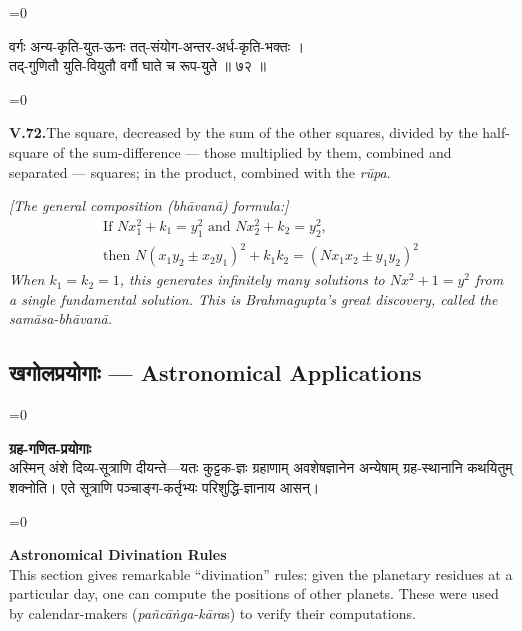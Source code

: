 \documentclass[11pt,a4paper]{article}
\newcommand{\dev}[1]{{\devanagarifont\color{sktcolor}#1}}
\newcommand{\iast}[1]{\textit{#1}}
\newenvironment{paracol}[1]{\begingroup}{\endgroup}
\newcommand{\switchcolumn}[1][]{%
  \ifnum#1=0\relax\else\par\nobreak\vspace{0.5em}\par\nobreak\fi%
}
\begin{document}
\begin{paracol}{2}
\switchcolumn[0]
\dev{%
वर्गः अन्य-कृति-युत-ऊनः तत्-संयोग-अन्तर-अर्ध-कृति-भक्तः ।\\
तद्-गुणितौ युति-वियुतौ वर्गौ घाते च रूप-युते ॥ ७२ ॥
}

\switchcolumn[1]
\textbf{V.72.}\quad The square, decreased by the sum of the other
squares, divided by the half-square of the sum-difference — those
multiplied by them, combined and separated — squares; in the
product, combined with the \iast{rūpa}.

\medskip
\textit{[The general composition (bhāvanā) formula:]}
\begin{align*}
\text{If } Nx_1^2 + k_1 = y_1^2 \text{ and } Nx_2^2 + k_2 = y_2^2,\\
\text{then } N(x_1y_2 \pm x_2y_1)^2 + k_1k_2 = (Nx_1x_2 \pm y_1y_2)^2
\end{align*}
\textit{When $k_1 = k_2 = 1$, this generates infinitely many solutions
to $Nx^2 + 1 = y^2$ from a single fundamental solution. This is
Brahmagupta's great discovery, called the \iast{samāsa-bhāvanā}.}
\end{paracol}

\newpage

\subsection*{\dev{खगोलप्रयोगाः — Astronomical Applications}}

\begin{paracol}{2}
\switchcolumn[0]
\dev{%
\textbf{ग्रह-गणित-प्रयोगाः}\\[0.2cm]
अस्मिन् अंशे दिव्य-सूत्राणि दीयन्ते—यतः कुट्टक-ज्ञः
ग्रहाणाम् अवशेषज्ञानेन अन्येषाम् ग्रह-स्थानानि कथयितुम्
शक्नोति। एते सूत्राणि पञ्चाङ्ग-कर्तृभ्यः
परिशुद्धि-ज्ञानाय आसन्।
}

\switchcolumn[1]
\textbf{Astronomical Divination Rules}\\[0.2cm]
This section gives remarkable ``divination'' rules: given the
planetary residues at a particular day, one can compute the
positions of other planets. These were used by calendar-makers
(\iast{pañcāṅga-kāra}s) to verify their computations.
\end{paracol}

\vspace{0.5cm}
\end{document}
